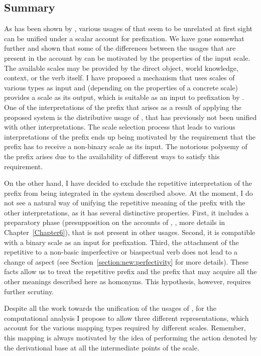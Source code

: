 \subsection{Summary}
As has been shown by \citet{Kagan:book}, various usages of  that seem to be unrelated at first sight can be unified under a scalar account for prefixation. We have gone somewhat further and shown that some of the differences between the usages that are present in the account by \citet{Kagan:book} can be motivated by the properties of the input scale. The available scales may be provided by the direct object, world knowledge, context, or the verb itself. I have proposed a mechanism that uses scales of various types as input and (depending on the properties of a concrete scale) provides a scale as its output, which is suitable as an input to prefixation by . One of the interpretations of the prefix that arises as a result of applying the proposed system is the distributive usage of , that has previously not been unified with other interpretations. The scale selection process that leads to various interpretations of the prefix ends up being motivated by the requirement that the prefix has to receive a non-binary scale as its input. The notorious polysemy of the prefix  arises due to the availability of different ways to satisfy this requirement. 

On the other hand, I have decided to exclude the repetitive interpretation of the prefix  from being integrated in the system described above. At the moment, I do not see a natural way of unifying the repetitive meaning of the prefix with the other interpretations, as it has several distinctive properties. First, it includes a preparatory phase (presupposition on the accounts of \citealt{Demjjanow:97}, \citealt{Kagan:book}, more details in Chapter~\ref{Chapter6}), that is not present in other usages. Second, it is compatible with a binary scale as an input for prefixation. Third, the attachment of the repetitive  to a non-basic imperfective or biaspectual verb does not lead to a change of aspect (see Section~\ref{section:new:perfectivity} for more details). These facts allow us to treat the repetitive prefix  and the prefix  that may acquire all the other meanings described here as homonyms. This hypothesis, however, requires further scrutiny.

Despite all the work towards the unification of the usages of , for the computational analysis I propose to allow three different representations, which account for the various mapping types required by different scales. Remember, this mapping is always motivated by the idea of performing the action denoted by the derivational base at all the intermediate points of the scale. 

